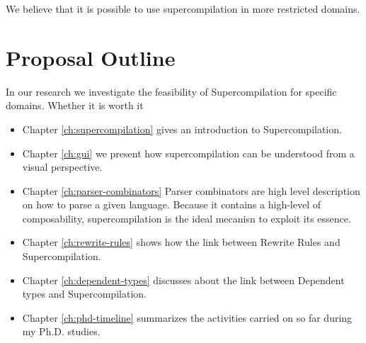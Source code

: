 We believe that it is possible to use supercompilation in more restricted domains.

\section{Proposal Outline}

In our research we investigate the feasibility of Supercompilation for specific domains.
Whether it is worth it

\begin{itemize}

\item Chapter \ref{ch:supercompilation} gives an introduction to Supercompilation.

\item Chapter \ref{ch:gui} we present how supercompilation can be understood from a visual perspective.

\item Chapter \ref{ch:parser-combinators} Parser combinators are high level description on how to parse a given language.
Because it contains a high-level of composability, supercompilation is the ideal mecanisn to exploit its essence.

\item Chapter \ref{ch:rewrite-rules} shows how the link between Rewrite Rules and Supercompilation.

\item Chapter \ref{ch:dependent-types} discusses about the link between Dependent types and Supercompilation.

\item Chapter \ref{ch:phd-timeline} summarizes the activities carried on so far during my Ph.D. studies.

\end{itemize}
